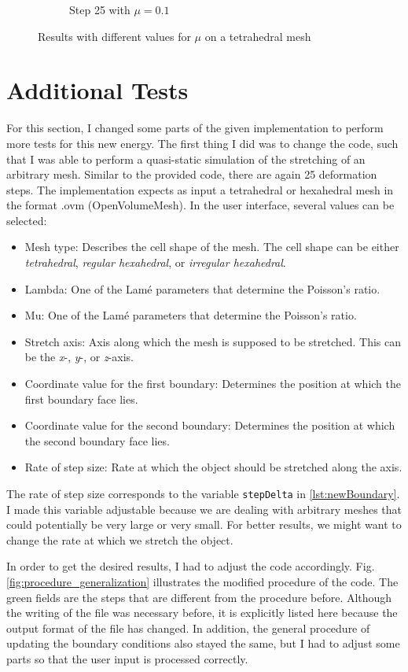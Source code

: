 \begin{figure}[!ht]
\begin{subfigure}{.47\textwidth}
  \caption{Step 25 with $\mu = 0.1$}
  \label{fig:mu_2}
\end{subfigure}
\caption{Results with different values for $\mu$ on a tetrahedral mesh}
\label{fig:mu}
\end{figure}

\newpage
\section{Additional Tests}
\label{s:generalization}
For this section, I changed some parts of the given implementation to perform more tests for this new energy. The first thing I did was to change the code, such that I was able to perform a quasi-static simulation of the stretching of an arbitrary mesh. Similar to the provided code, there are again 25 deformation steps. The implementation expects as input a tetrahedral or hexahedral mesh in the format .ovm (OpenVolumeMesh). In the user interface, several values can be selected:
\begin{itemize}
	\item Mesh type: Describes the cell shape of the mesh. The cell shape can be either \textit{tetrahedral}, \textit{regular hexahedral}, or \textit{irregular hexahedral}.
	\item Lambda: One of the Lamé parameters that determine the Poisson's ratio.
	\item Mu: One of the Lamé parameters that determine the Poisson's ratio.
	\item Stretch axis: Axis along which the mesh is supposed to be stretched. This can be the \textit{x}-, \textit{y}-, or \textit{z}-axis.
	\item Coordinate value for the first boundary: Determines the position at which the first boundary face lies.
	\item Coordinate value for the second boundary: Determines the position at which the second boundary face lies.
	\item Rate of step size: Rate at which the object should be stretched along the axis.
\end{itemize}

The rate of step size corresponds to the variable \verb|stepDelta| in \autoref{lst:newBoundary}. I made this variable adjustable because we are dealing with arbitrary meshes that could potentially be very large or very small. For better results, we might want to change the rate at which we stretch the object. 

In order to get the desired results, I had to adjust the code accordingly. Fig. \ref{fig:procedure_generalization} illustrates the modified procedure of the code. The green fields are the steps that are different from the procedure before. Although the writing of the file was necessary before, it is explicitly listed here because the output format of the file has changed. In addition, the general procedure of updating the boundary conditions also stayed the same, but I had to adjust some parts so that the user input is processed correctly.

